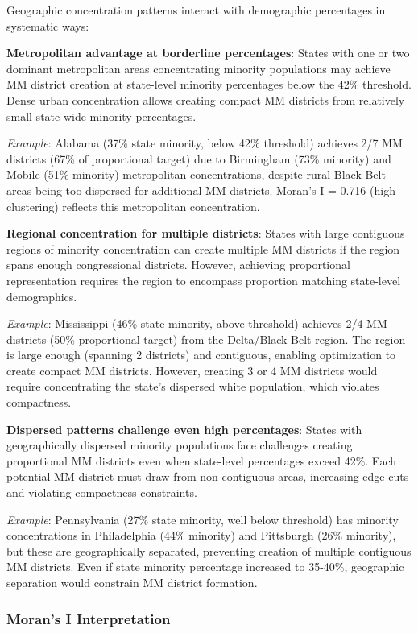 Geographic concentration patterns interact with demographic percentages in systematic ways:

\textbf{Metropolitan advantage at borderline percentages}: States with one or two dominant metropolitan areas concentrating minority populations may achieve MM district creation at state-level minority percentages below the 42\% threshold. Dense urban concentration allows creating compact MM districts from relatively small state-wide minority percentages.

\textit{Example}: Alabama (37\% state minority, below 42\% threshold) achieves 2/7 MM districts (67\% of proportional target) due to Birmingham (73\% minority) and Mobile (51\% minority) metropolitan concentrations, despite rural Black Belt areas being too dispersed for additional MM districts. Moran's I = 0.716 (high clustering) reflects this metropolitan concentration.

\textbf{Regional concentration for multiple districts}: States with large contiguous regions of minority concentration can create multiple MM districts if the region spans enough congressional districts. However, achieving proportional representation requires the region to encompass proportion matching state-level demographics.

\textit{Example}: Mississippi (46\% state minority, above threshold) achieves 2/4 MM districts (50\% proportional target) from the Delta/Black Belt region. The region is large enough (spanning 2 districts) and contiguous, enabling optimization to create compact MM districts. However, creating 3 or 4 MM districts would require concentrating the state's dispersed white population, which violates compactness.

\textbf{Dispersed patterns challenge even high percentages}: States with geographically dispersed minority populations face challenges creating proportional MM districts even when state-level percentages exceed 42\%. Each potential MM district must draw from non-contiguous areas, increasing edge-cuts and violating compactness constraints.

\textit{Example}: Pennsylvania (27\% state minority, well below threshold) has minority concentrations in Philadelphia (44\% minority) and Pittsburgh (26\% minority), but these are geographically separated, preventing creation of multiple contiguous MM districts. Even if state minority percentage increased to 35-40\%, geographic separation would constrain MM district formation.

\subsubsection{Moran's I Interpretation}

